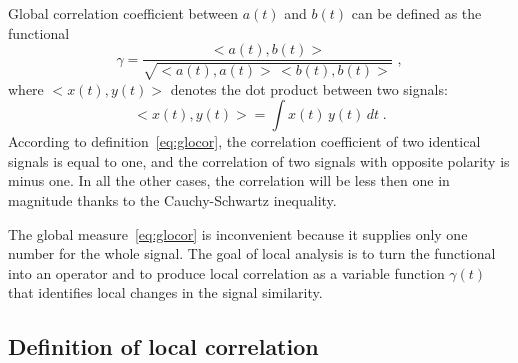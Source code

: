 Global correlation coefficient between $a(t)$ and $b(t)$ can be
defined as the functional
\begin{equation}
  \label{eq:glocor}
  \gamma = \frac{<a(t),b(t)>}{\sqrt{<a(t),a(t)>\,<b(t),b(t)>}}\;,
\end{equation}
where $<x(t),y(t)>$ denotes the dot product between two  signals:
\begin{equation}
  \label{eq:dotprod}
  <x(t),y(t)> = \int x(t)\,y(t)\,d t\;.
\end{equation}
According to  definition~\ref{eq:glocor}, the correlation
coefficient of two identical signals is equal to one, and the
correlation of two signals with opposite polarity is minus one. In all
the other cases, the correlation will be less then one in magnitude
thanks to the Cauchy-Schwartz inequality. 

The global measure~\ref{eq:glocor} is inconvenient because it
supplies only one number for the whole signal. The goal of local
analysis is to turn the functional into an operator and to produce
local correlation as a variable function $\gamma(t)$ that identifies
local changes in the signal similarity.

\subsection{Definition of local correlation}

